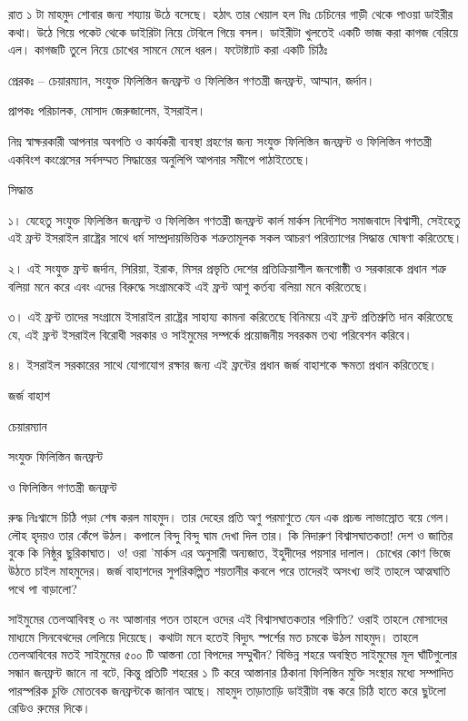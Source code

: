 \documentclass[
]{book}
\begin{document}
রাত ১ টা মাহমুদ শোবার জন্য শয্যায় উঠে বসেছে। হঠাৎ তার খেয়াল হল মিঃ চেচিনের গাড়ী থেকে পাওয়া ডাইরীর কথা। উঠে গিয়ে পকেট থেকে ডাইরিটা নিয়ে টেবিলে গিয়ে বসল। ডাইরীটা খুলতেই একটি ভাজ করা কাগজ বেরিয়ে এল। কাগজটি তুলে নিয়ে চোখের সামনে মেলে ধরল। ফটোষ্ট্যাট করা একটি চিঠিঃ

প্রেরকঃ -- চেয়ারম্যান, সংযুক্ত ফিলিস্তিন জনফ্রন্ট ও ফিলিস্তিন গণতন্ত্রী জনফ্রন্ট, আম্মান, জর্দান।

প্রাপকঃ পরিচালক, মোসাদ জেরুজালেম, ইসরাইল।

নিম্ন স্বাক্ষরকারী আপনার অবগতি ও কার্যকরী ব্যবস্থা গ্রহণের জন্য সংযুক্ত ফিলিস্তিন জনফ্রন্ট ও ফিলিস্তিন গণতন্ত্রী একবিংশ কংগ্রেসের সর্বসম্মত সিদ্ধান্তের অনুলিপি আপনার সমীপে পাঠাইতেছে।

সিদ্ধান্ত

১। যেহেতু সংযুক্ত ফিলিস্তিন জনফ্রন্ট ও ফিলিস্তিন গণতন্ত্রী জনফ্রন্ট কার্ল মার্কস নির্দেশিত সমাজবাদে বিশ্বাসী, সেইহেতু এই ফ্রন্ট ইসরাইল রাষ্ট্রের সাথে ধর্ম সাম্প্রদায়ভিত্তিক শত্রুতামূলক সকল আচরণ পরিত্যাগের সিদ্ধান্ত ঘোষণা করিতেছে।

২। এই সংযুক্ত ফ্রন্ট জর্দান, সিরিয়া, ইরাক, মিসর প্রভৃতি দেশের প্রতিক্রিয়াশীল জনগোষ্ঠী ও সরকারকে প্রধান শত্রু বলিয়া মনে করে এবং এদের বিরুদ্ধে সংগ্রামকেই এই ফ্রন্ট আশু কর্তব্য বলিয়া মনে করিতেছে।

৩। এই ফ্রন্ট তাদের সংগ্রামে ইসারাইল রাষ্ট্রের সাহায্য কামনা করিতেছে বিনিময়ে এই ফ্রন্ট প্রতিশ্রুতি দান করিতেছে যে, এই ফ্রন্ট ইসরাইল বিরোধী সরকার ও সাইমুমের সম্পর্কে প্রয়োজনীয় সবরকম তথ্য পরিবেশন করিবে।

৪। ইসরাইল সরকারের সাথে যোগাযোগ রক্ষার জন্য এই ফ্রন্টের প্রধান জর্জ বাহাশকে ক্ষমতা প্রধান করিতেছে।

জর্জ বাহাশ

চেয়ারম্যান

সংযুক্ত ফিলিস্তিন জনফ্রন্ট

ও ফিলিস্তিন গণতন্ত্রী জনফ্রন্ট

রুদ্ধ নিঃশ্বাসে চিঠি পড়া শেষ করল মাহমুদ। তার দেহের প্রতি অণু পরমাণুতে যেন এক প্রচন্ড লাভাস্রোত বয়ে গেল। লৌহ হৃদয়ও তার কেঁপে উঠল। কপালে বিন্দু বিন্দু ঘাম দেখা দিল তার। কি নিদারুণ বিশ্বাসঘাতকতা! দেশ ও জাতির বুকে কি নিষ্ঠুর ছুরিকাঘাত। ও! ওরা 'মার্কস এর অনুসারী অন্যজাত, ইহুদীদের পয়সার দালাল। চোখের কোণ ভিজে উঠতে চাইল মাহমুদের। জর্জ বাহাশদের সুপরিকল্পিত শয়তানীর কবলে পরে তাদেরই অসংখ্য ভাই তাহলে আত্মঘাতি পথে পা বাড়ালো?

সাইমুমের তেলআবিবস্থ ৩ নং আস্তানার পতন তাহলে ওদের এই বিশ্বাসঘাতকতার পরিণতি? ওরাই তাহলে মোসাদের মাধ্যমে সিনবেথদের লেলিয়ে দিয়েছে। কথাটা মনে হতেই বিদ্যুৎ স্পর্শের মত চমকে উঠল মাহমুদ। তাহলে তেলআবিবের মতই সাইমুমের ৫০০ টি আস্তনা তো বিপদের সম্মুখীন? বিভিন্ন শহরে অবস্থিত সাইমুমের মূল ঘাঁটিগুলোর সন্ধান জনফ্রন্ট জানে না বটে, কিন্তু প্রতিটি শহরের ১ টি করে আস্তানার ঠিকানা ফিলিস্তিন মুক্তি সংস্থার মধ্যে সম্পাদিত পারস্পরিক চুক্তি মোতবেক জনফ্রন্টকে জানান আছে। মাহমুদ তাড়াতাড়ি ডাইরীটা বন্ধ করে চিঠি হাতে করে ছুটলো রেডিও রুমের দিকে।
\end{document}
